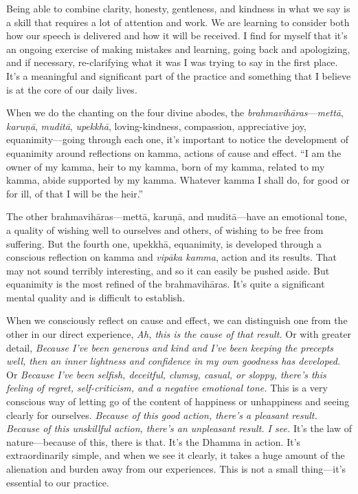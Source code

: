 Being able to combine clarity, honesty, gentleness, and kindness in 
what we say is a skill that requires a lot of attention and work. We 
are learning to consider both how our speech is delivered and how it 
will be received. I find for myself that it's an ongoing exercise of 
making mistakes and learning, going back and apologizing, and if 
necessary, re-clarifying what it was I was trying to say in the first 
place. It's a meaningful and significant part of the practice and 
something that I believe is at the core of our daily lives.


When we do the chanting on the four divine abodes, the 
\emph{brahmavihāras}---\emph{mettā}, \emph{karuṇā}, 
\emph{muditā}, \emph{upekkhā}, loving-kindness, compassion, 
appreciative joy, equanimity---going through each one, it's important 
to notice the development of equanimity around reflections on kamma, 
actions of cause and effect. ``I am the owner of my kamma, heir to my 
kamma, born of my kamma, related to my kamma, abide supported by my 
kamma. Whatever kamma I shall do, for good or for ill, of that I will 
be the heir.''

The other brahmavihāras---mettā, karuṇā, and muditā---have an 
emotional tone, a quality of wishing well to ourselves and others, of 
wishing to be free from suffering. But the fourth one, upekkhā, 
equanimity, is developed through a conscious reflection on kamma and 
\emph{vipāka kamma}, action and its results. That may not sound 
terribly interesting, and so it can easily be pushed aside. But 
equanimity is the most refined of the brahmavihāras. It's quite a 
significant mental quality and is difficult to establish.

When we consciously reflect on cause and effect, we can distinguish one 
from the other in our direct experience, \emph{Ah, this is the cause of 
that result.} Or with greater detail, \emph{Because I've been generous 
and kind and I've been keeping the precepts well, then an inner 
lightness and confidence in my own goodness has developed.} Or 
\emph{Because I've been selfish, deceitful, clumsy, casual, or sloppy, 
there's this feeling of regret, self-criticism, and a negative 
emotional tone.} This is a very conscious way of letting go of the 
content of happiness or unhappiness and seeing clearly for ourselves. 
\emph{Because of this good action, there's a pleasant result. Because 
of this unskillful action, there's an unpleasant result. I see.} It's 
the law of nature---because of this, there is that. It's the Dhamma in 
action. It's extraordinarily simple, and when we see it clearly, it 
takes a huge amount of the alienation and burden away from our 
experiences. This is not a small thing---it's essential to our practice.

